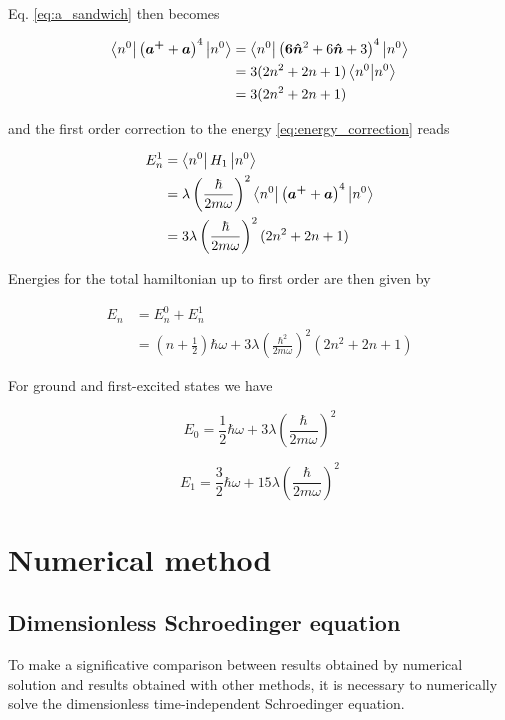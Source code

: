 \documentclass{article}
\begin{document}
Eq. \eqref{eq:a_sandwich} then becomes


\begin{align}
\bra{n^0} \left( \bm{a^+} + \bm{a} \right)^4 \ket{n^0} & = \bra{n^0} \left( \bm{ 6 \hat{n} }^2 + 6 \bm{ \hat{n} } + 3 \right)^4 \ket{n^0} \nonumber \\
& = 3 (2n^2 + 2n +1) \braket{n^0}{n^0} \nonumber \\
& = 3(2n^2 + 2n +1)
\end{align}

and the first order correction to the energy \eqref{eq:energy_correction} reads

\begin{align}
\label{eq:x4correction}
E_n^1 & = \bra{n^0} H_1 \ket{n^0} \nonumber \\
& = \lambda \left( \frac{\hbar}{2m \omega} \right)^2 \bra{n^0} \left( \bm{a^+} + \bm{a} \right)^4 \ket{n^0} \nonumber \\
& = 3 \lambda \left( \frac{\hbar}{2m \omega} \right)^2 (2n^2 + 2n +1)
\end{align}

Energies for the total hamiltonian up to first order are then given by

\begin{align}
E_n & = E_n^0 + E_n^1 \nonumber \\
& = \left( n + \frac{1}{2} \right) \hbar \omega + 3 \lambda \left( \frac{\hbar^2}{2m\omega} \right)^2 (2n^2 + 2n +1)
\end{align}

For ground and first-excited states we have

\begin{equation}
E_0 = \frac{1}{2} \hbar \omega + 3 \lambda \left( \frac{\hbar}{2m\omega} \right)^2
\end{equation}

\begin{equation}
E_1 = \frac{3}{2} \hbar \omega + 15 \lambda \left( \frac{\hbar}{2m\omega} \right)^2
\end{equation}

\section{Numerical method}

\subsection{Dimensionless Schroedinger equation}
To make a significative comparison between results obtained by numerical solution and results obtained with other methods, it is necessary to numerically solve the dimensionless time-independent Schroedinger equation.
\end{document}
